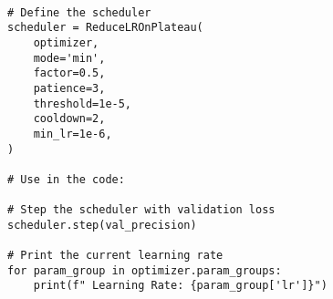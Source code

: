 \newcommand{\vertline}{\textbar} %
\newcommand{\cornerline}{\rule{1.5ex}{0.4pt}} %
\newcommand{\branch}{\textbar\cornerline} %




\EN
\begin{tcolorbox}[colframe=black, colback=gray!5, boxrule=0.5mm, sharp corners]

\begin{verbatim}

# Define the scheduler
scheduler = ReduceLROnPlateau(
    optimizer,
    mode='min',
    factor=0.5,
    patience=3,
    threshold=1e-5,
    cooldown=2,
    min_lr=1e-6,
)

# Use in the code:

# Step the scheduler with validation loss
scheduler.step(val_precision)

# Print the current learning rate
for param_group in optimizer.param_groups:
    print(f" Learning Rate: {param_group['lr']}")
\end{verbatim}
\end{tcolorbox}

\HE

\HE